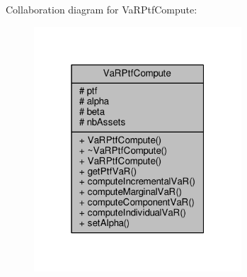 Collaboration diagram for Va\+R\+Ptf\+Compute\+:
\nopagebreak
\begin{figure}[H]
\begin{center}
\leavevmode
\includegraphics[width=220pt]{classVaRPtfCompute__coll__graph}
\end{center}
\end{figure}
